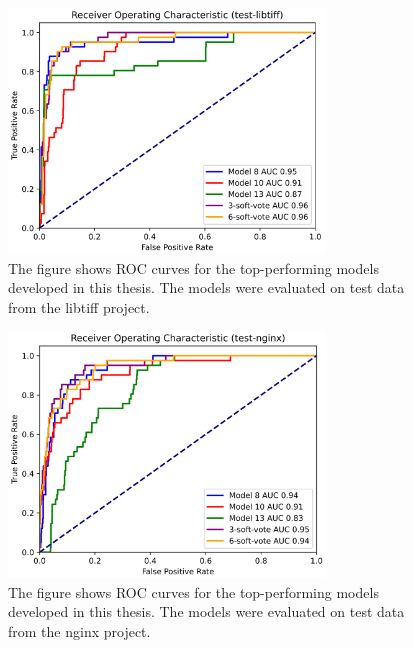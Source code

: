 \begin{figure}[ht]
	\centering
	\includegraphics[width=0.75\textwidth]{figures/auc-libtiff.png}
	\caption{The figure shows ROC curves for the top-performing models developed in this thesis. The models were evaluated on test data from the libtiff project.}
	\label{figure:auc-libtiff}
\end{figure}

\begin{figure}[ht]
	\centering
	\includegraphics[width=0.75\textwidth]{figures/auc-nginx.png}
	\caption{The figure shows ROC curves for the top-performing models developed in this thesis. The models were evaluated on test data from the nginx project.}
	\label{figure:auc-nginx}
\end{figure}

